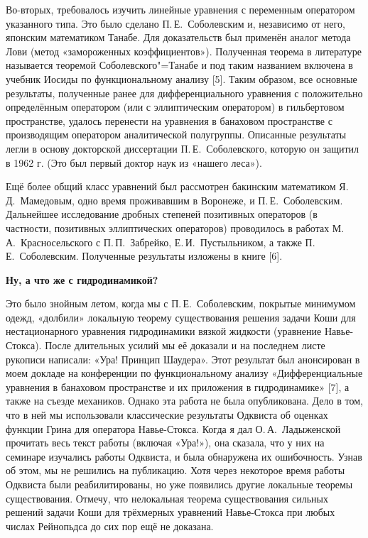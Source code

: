 Во-вторых, требовалось изучить линейные уравнения с переменным оператором указанного типа.
Это было сделано П.\,Е.~Соболевским и, независимо от него, японским математиком Танабе.
Для доказательств был применён аналог метода Лови (метод «замороженных коэффициентов»).
Полученная теорема в литературе называется теоремой Соболевского"=Танабе и под таким названием
включена в учебник Иосиды по функциональному анализу [5].
Таким образом, все основные результаты,
полученные ранее для дифференциального уравнения с положительно определённым оператором (или с эллиптическим оператором)
в гильбертовом пространстве,
удалось перенести на уравнения в банаховом пространстве с производящим оператором аналитической полугруппы. Описанные результаты легли в основу докторской диссертации П.\,Е.~Соболевского, которую он защитил в 1962 г. (Это был первый доктор наук из «нашего леса»).

Ещё более общий класс уравнений был рассмотрен бакинским математиком Я.\,Д.~Мамедовым, одно время проживавшим в Воронеже,
и П.\,Е.~Соболевским. Дальнейшее исследование дробных степеней позитивных операторов
(в частности, позитивных эллиптических операторов) проводилось в работах М.\,А.~Красносельского с П.\,П.~Забрейко, Е.\,И.~Пустыльником, а также П.\,Е.~Соболевским. Полученные результаты изложены в книге [6].

{\bf Ну, а что же с гидродинамикой?}

Это было знойным летом, когда мы с П.\,Е.~Соболевским, покрытые минимумом одежд, «долбили» локальную теорему существования решения задачи Коши для нестационарного уравнения гидродинамики вязкой жидкости (уравнение Навье-Стокса). После длительных усилий мы её доказали и на последнем листе рукописи написали: «Ура! Принцип Шаудера». Этот результат был анонсирован в моем докладе на конференции по функциональному анализу «Дифференциальные уравнения в банаховом пространстве и их приложения в гидродинамике» [7], а также на съезде механиков. Однако эта работа не была опубликована. Дело в том, что в ней мы использовали классические результаты Одквиста об оценках функции Грина для оператора Навье-Стокса. Когда я дал О.\,А.~Ладыженской прочитать весь текст работы (включая «Ура!»), она сказала, что у них на семинаре изучались работы Одквиста, и была обнаружена их ошибочность. Узнав об этом, мы не решились на публикацию. Хотя через некоторое время работы Одквиста были реабилитированы, но уже появились другие локальные теоремы существования. Отмечу, что нелокальная теорема существования сильных решений задачи Коши для трёхмерных уравнений Навье-Стокса при любых числах Рейнопьдса до сих пор ещё не доказана.

